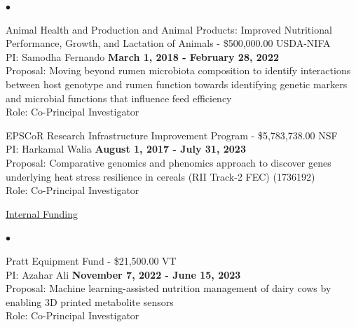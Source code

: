 \documentclass[margin,line,10pt]{res}
\newenvironment{list2}{
  \begin{list}{$\bullet$}{%
      \setlength{\itemsep}{0in}
      \setlength{\parsep}{0in} \setlength{\parskip}{0in}
      \setlength{\topsep}{0in} \setlength{\partopsep}{0in} 
      \setlength{\leftmargin}{0.2in}}}{\end{list}}
\begin{document}
\begin{resume}
\begin{list2}
\vspace{0.5cm}

\item Animal Health and Production and Animal Products: Improved Nutritional Performance, Growth, and Lactation of Animals  - \$500,000.00  \hfill USDA-NIFA\\
PI: Samodha Fernando   \hfill \textbf{March 1, 2018 - February 28, 2022}\\
Proposal: Moving beyond rumen microbiota composition to identify interactions between host genotype and rumen function towards identifying genetic markers and microbial functions that influence feed efficiency  \\
Role: Co-Principal Investigator \\

\vspace{0.5cm}





\vspace{0.5cm}
  
\item EPSCoR Research Infrastructure Improvement Program - \$5,783,738.00   \hfill NSF  \\
PI: Harkamal Walia   \hfill \textbf{August 1, 2017 - July 31, 2023}\\
Proposal:  Comparative genomics and phenomics approach to discover genes underlying heat stress resilience in cereals  (RII Track-2 FEC)  (1736192) \\
Role: Co-Principal Investigator \\

\end{list2}




\begin{flushleft}
\hspace{0.2cm} \underline{Internal Funding}
\end{flushleft}
\begin{list2}


  \item Pratt Equipment Fund - \$21,500.00  \hfill VT\\
  PI: Azahar Ali \hfill \textbf{November 7, 2022 - June 15, 2023}\\
  Proposal: Machine learning-assisted nutrition management of dairy cows by enabling 3D printed metabolite sensors\\
  Role: Co-Principal Investigator \\
  

\end{list2}
\end{resume}
\end{document}
